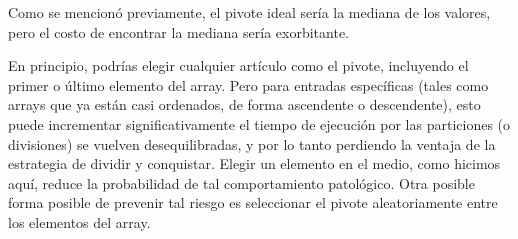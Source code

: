 
Como se mencionó previamente, el pivote ideal sería la mediana 
de los valores, pero el costo de encontrar la mediana sería 
exorbitante.

En principio, podrías elegir cualquier artículo como el pivote,
incluyendo el primer o último elemento del array. Pero para 
entradas específicas (tales como arrays que ya están casi ordenados,
de forma ascendente o descendente), esto puede incrementar significativamente
el tiempo de ejecución por las particiones (o divisiones)
se vuelven desequilibradas, y por lo tanto perdiendo la ventaja de
la estrategia de dividir y conquistar. Elegir un elemento en el medio,
como hicimos aquí, reduce la probabilidad de tal comportamiento patológico.
Otra posible forma posible de prevenir tal riesgo es seleccionar el
pivote aleatoriamente entre los elementos del array.



